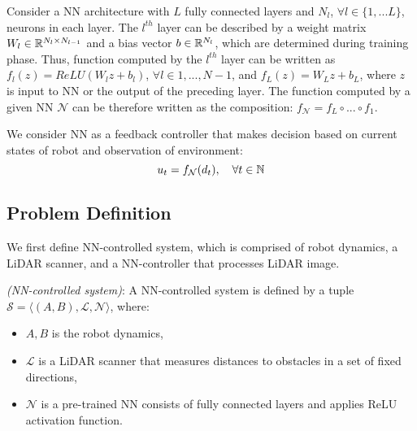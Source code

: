 Consider a NN architecture with $L$ fully connected layers and $N_l$, $\forall l \in \{1,...L\}$, neurons in each layer.
The $l^{th}$ layer can be described by a weight matrix $W_l \in {\mathbb{R}}^{N_l \times N_{l-1}}$ and a bias vector $b \in {\mathbb{R}}^{N_l}$,
which are determined during training phase.
Thus, function computed by the $l^{th}$ layer can be written as $f_l(z) = ReLU(W_l z + b_l)$, $\forall l \in {1, ..., N-1}$, 
and $f_L(z) = W_L z + b_L$, where $z$ is input to NN or the output of the preceding layer.
The function computed by a given NN $\mathcal{N}$ can be therefore written as the composition: 
$f_{\mathcal{N}} = f_L \circ ... \circ f_1$.

We consider NN as a feedback controller that makes decision based on current states of robot and observation of environment:
\begin{equation}    
    \label{eq:nn_nonlinear}    
    u_t = f_{\mathcal{N}}(d_t), \quad \forall t \in {\mathbb{N}}
\end{equation}    





\subsection{Problem Definition}
We first define NN-controlled system, which is comprised of robot dynamics, a LiDAR scanner, 
and a NN-controller that processes LiDAR image.

\begin{definition}
    \textit{(NN-controlled system)}: 
    A NN-controlled system is defined by a tuple 
    $\mathcal{S} = \langle (A, B), \mathcal{L}, \mathcal{N} \rangle$, where:
    \begin{itemize} 
        \item ${A, B}$ is the robot dynamics,
        \item $\mathcal{L}$ is a LiDAR scanner that measures distances to obstacles in a set of fixed directions,
        \item $\mathcal{N}$ is a pre-trained NN consists of fully connected layers and applies ReLU activation function.
    \end{itemize}
\end{definition}    


